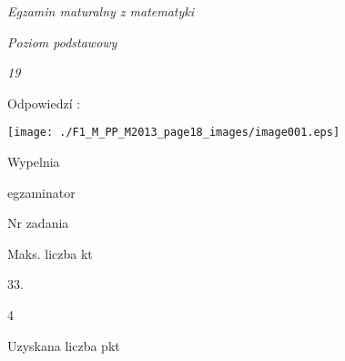 \documentclass[a4paper,12pt]{article}
\begin{document}
{\it Egzamin maturalny z matematyki}

{\it Poziom podstawowy}

{\it 19}

Odpowiedzí :
\begin{center}
\texttt{[image: ./F1\_M\_PP\_M2013\_page18\_images/image001.eps]}
\end{center}
Wypelnia

egzaminator

Nr zadania

Maks. liczba kt

33.

4

Uzyskana liczba pkt
\end{document}
